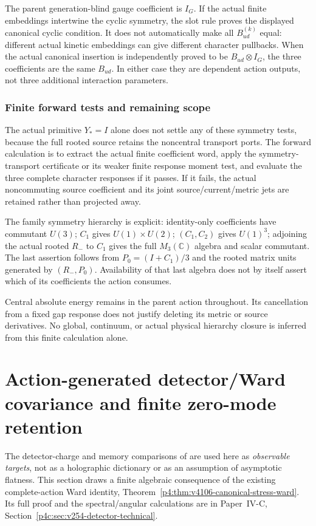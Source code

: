 \documentclass[12pt,a4paper]{article}
\begin{document}
The parent generation-blind gauge coefficient is $I_G$. If the actual
finite embeddings intertwine the cyclic symmetry, the slot rule proves
the displayed canonical cyclic condition. It does not automatically make
all $B_{ud}^{(k)}$ equal: different actual kinetic embeddings can give
different character pullbacks. When the actual canonical insertion is
independently proved to be $B_{ud}\otimes I_G$, the three coefficients
are the same $B_{ud}$. In either case they are dependent action outputs,
not three additional interaction parameters.

\subsubsection{Finite forward tests and remaining scope}
The actual primitive $Y_*=I$ alone does not settle any of these symmetry
tests, because the full rooted source retains the noncentral transport
ports. The forward calculation is to extract the actual finite coefficient
word, apply the symmetry-transport certificate or its weaker finite response
moment test, and evaluate the three complete character responses if it
passes. If it fails, the actual noncommuting source coefficient and its
joint source/current/metric jets are retained rather than projected away.

The family symmetry hierarchy is explicit: identity-only coefficients
have commutant $U(3)$; $C_1$ gives $U(1)\times U(2)$; $(C_1,C_2)$ gives
$U(1)^3$; adjoining the actual rooted $R_-$ to $C_1$ gives the full
$M_3(\mathbb C)$ algebra and scalar commutant. The last assertion follows
from $P_0=(I+C_1)/3$ and the rooted matrix units generated by $(R_-,P_0)$.
Availability of that last algebra does not by itself assert which of its
coefficients the action consumes.

Central absolute energy remains in the parent action throughout. Its
cancellation from a fixed gap response does not justify deleting its metric
or source derivatives. No global, continuum, or actual physical hierarchy
closure is inferred from this finite calculation alone.



\section{Action-generated detector/Ward covariance and finite zero-mode retention}
\label{p4b:sec:v254-detector-ward}
The detector-charge and memory comparisons of
\cite{OertelMoultPasterski2026Detectors,MoultNarayananPasterski2026MemoryCorrelators,PasterskiStromingerZhiboedov2016Memory}
are used here as \emph{observable targets}, not as a holographic dictionary or
as an assumption of asymptotic flatness. This section draws a finite algebraic
consequence of the existing complete-action Ward identity,
Theorem~\ref{p4:thm:v4106-canonical-stress-ward}. Its full proof and the
spectral/angular calculations are in Paper~IV-C,
Section~\ref{p4c:sec:v254-detector-technical}.
\end{document}
